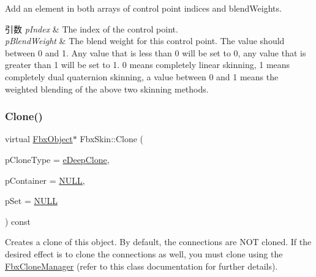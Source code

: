 Add an element in both arrays of control point indices and blend\+Weights. 
\begin{DoxyParams}{引数}
{\em p\+Index} & The index of the control point. \\
\hline
{\em p\+Blend\+Weight} & The blend weight for this control point. The value should between 0 and 1. Any value that is less than 0 will be set to 0, any value that is greater than 1 will be set to 1. 0 means completely linear skinning, 1 means completely dual quaternion skinning, a value between 0 and 1 means the weighted blending of the above two skinning methods. \\
\hline
\end{DoxyParams}
\mbox{\label{class_fbx_skin_ad6699903d1b3ef2ea14769a6e75caeed}} 
\subsubsection{\texorpdfstring{Clone()}{Clone()}}
{\footnotesize\ttfamily virtual \hyperlink{class_fbx_object}{Fbx\+Object}$\ast$ Fbx\+Skin\+::\+Clone (\begin{DoxyParamCaption}\item[{\hyperlink{class_fbx_object_a9f5626b2d2135684d6ea1e6e4ad2acbb}{Fbx\+Object\+::\+E\+Clone\+Type}}]{p\+Clone\+Type = {\ttfamily \hyperlink{class_fbx_object_a9f5626b2d2135684d6ea1e6e4ad2acbbaacdf137ca059c572798287e98c4236d0}{e\+Deep\+Clone}},  }\item[{\hyperlink{class_fbx_object}{Fbx\+Object} $\ast$}]{p\+Container = {\ttfamily \hyperlink{fbxarch_8h_a070d2ce7b6bb7e5c05602aa8c308d0c4}{N\+U\+LL}},  }\item[{void $\ast$}]{p\+Set = {\ttfamily \hyperlink{fbxarch_8h_a070d2ce7b6bb7e5c05602aa8c308d0c4}{N\+U\+LL}} }\end{DoxyParamCaption}) const\hspace{0.3cm}{\ttfamily [virtual]}}

Creates a clone of this object. By default, the connections are N\+OT cloned. If the desired effect is to clone the connections as well, you must clone using the \hyperlink{class_fbx_clone_manager}{Fbx\+Clone\+Manager} (refer to this class documentation for further details).


